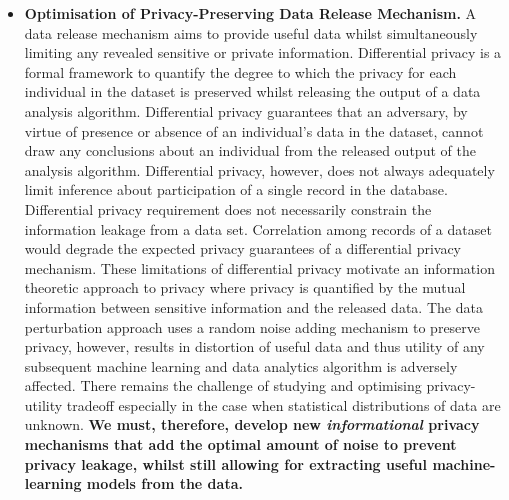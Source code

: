 \documentclass[a4paper,11pt]{article}
\begin{document}
\begin{itemize}
\item \textbf{Optimisation of Privacy-Preserving Data Release Mechanism.} A data release mechanism aims to provide useful data %
whilst simultaneously limiting any revealed sensitive or private information. %
Differential privacy is a formal framework to quantify the degree to which the privacy for each individual in the dataset is preserved whilst releasing the output of a data analysis algorithm. Differential privacy guarantees that an adversary, by virtue of presence or absence of an individual's data in the dataset, cannot draw any conclusions about an individual from the released output of the analysis algorithm. Differential privacy, however, does not always adequately limit inference about participation of a single record in the database. Differential privacy requirement does not necessarily constrain the information leakage from a data set. Correlation among records of a dataset would degrade the expected privacy guarantees of a differential privacy mechanism. These limitations of differential privacy motivate an information theoretic approach to privacy where privacy is quantified by the mutual information between sensitive information and the released data. The data perturbation approach uses a random noise adding mechanism to preserve privacy, however, results in distortion of useful data and thus utility of any subsequent machine learning and data analytics algorithm is adversely affected. There remains the challenge of studying and optimising privacy-utility tradeoff especially in the case when statistical distributions of data are unknown. \textbf{We must, therefore, develop new \emph{informational} privacy mechanisms that add the optimal amount of noise to prevent privacy leakage, whilst still allowing for extracting useful machine-learning models from the data.}



\end{itemize}
\end{document}

